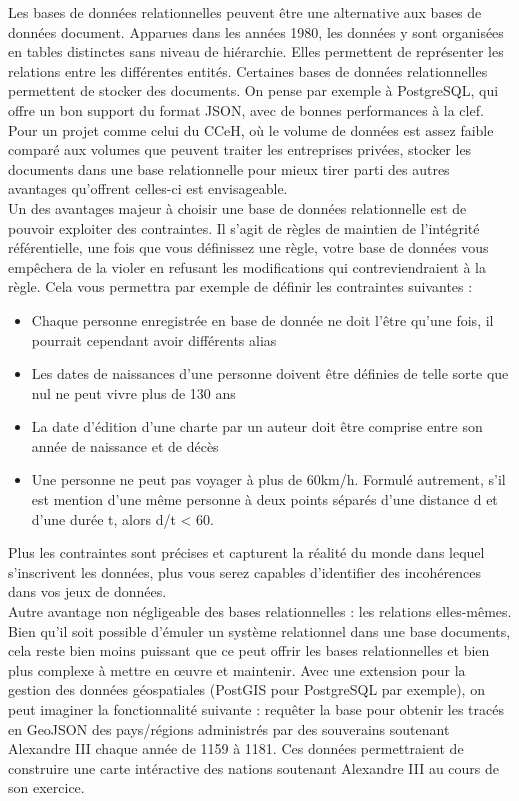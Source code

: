 Les bases de données relationnelles peuvent être une alternative aux bases de données document. Apparues dans les années 1980, les données y sont organisées en tables distinctes sans niveau de hiérarchie. Elles permettent de représenter les relations entre les différentes entités. Certaines bases de données relationnelles permettent de stocker des documents. On pense par exemple à PostgreSQL, qui offre un bon support du format JSON, avec de bonnes  performances à la clef. Pour un projet comme celui du CCeH, où le volume de données est assez faible comparé aux volumes que peuvent traiter les entreprises privées, stocker les documents dans une base relationnelle pour mieux tirer parti des autres avantages qu’offrent celles-ci est envisageable.\\ 
Un des avantages majeur à choisir une base de données relationnelle est de pouvoir exploiter des contraintes. Il s’agit de règles de maintien  de l’intégrité référentielle, une fois que vous définissez une règle, votre base de données vous empêchera de la violer en refusant les modifications qui contreviendraient à la règle. Cela vous permettra par exemple de définir les contraintes suivantes :\\
\begin{itemize}
    \item Chaque personne enregistrée en base de donnée ne doit l’être qu’une fois, il pourrait cependant avoir différents alias
    \item Les dates de naissances d’une personne doivent être définies de telle sorte que nul ne peut vivre plus de 130 ans
    \item La date d’édition d’une charte par un auteur doit être comprise entre son année de naissance et de décès
    \item Une personne ne peut pas voyager à plus de 60km/h. Formulé autrement, s’il est mention d’une même personne à deux points séparés d’une distance d et d’une durée t, alors d/t < 60.\\
    
\end{itemize}

\noindent Plus les contraintes sont précises et capturent la réalité du monde dans lequel s’inscrivent les données, plus vous serez capables d’identifier des incohérences dans vos jeux de données.\\
Autre avantage non négligeable des bases relationnelles : les relations elles-mêmes. Bien qu’il soit possible d’émuler un système relationnel dans une base documents, cela reste bien moins puissant que ce peut offrir les bases relationnelles et bien plus complexe à mettre en œuvre et maintenir.
Avec une extension pour la gestion des données géospatiales (PostGIS pour PostgreSQL par exemple), on peut imaginer la fonctionnalité suivante : requêter la base pour obtenir les tracés en GeoJSON des pays/régions administrés par des souverains soutenant Alexandre III chaque année de 1159 à 1181. Ces données permettraient de construire une carte intéractive des nations soutenant Alexandre III au cours de son exercice.

